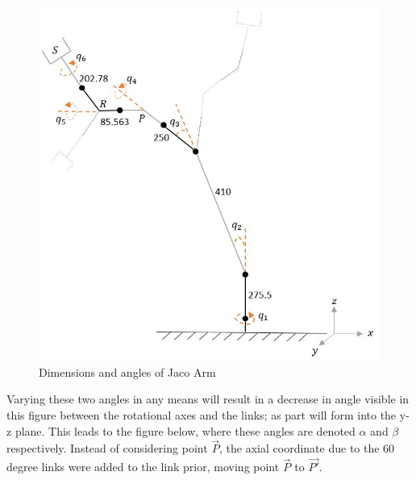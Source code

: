 \documentclass[12pt,openany,a4paper]{book}
\begin{document}
\begin{center}
\begin{figure}[htb]
  \includegraphics[width=0.9\linewidth]{jaco_angles_figure.jpg}
\caption{Dimensions and angles of Jaco Arm}
\end{figure}
\end{center}

Varying these two angles in any means will result in a decrease in angle visible in this figure between the rotational axes and the links; as part will form into the y-z plane. This leads to the figure below, where these angles are denoted $\alpha$ and $\beta$ respectively. Instead of considering point $\vec{P}$, the axial coordinate due to the 60 degree links were added to the link prior, moving point $\vec{P}$ to $\vec{P'}$.
\end{document}
